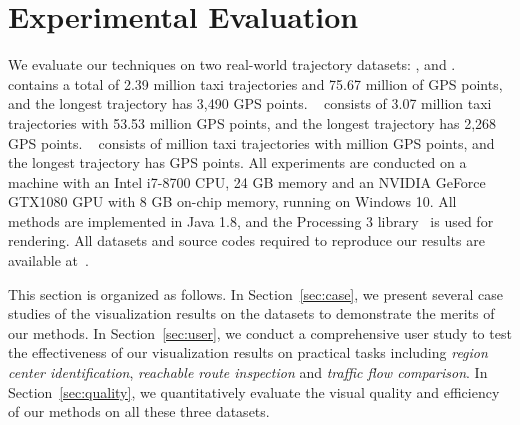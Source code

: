 \section{Experimental Evaluation}\label{sec:exp}
We evaluate our techniques on two real-world trajectory datasets: \pt{}, \sz{} and \cd{}.
\pt{}~\cite{pt} contains a total of 2.39 million taxi trajectories and 75.67 million of GPS points, and the longest trajectory has 3,490 GPS points.
\sz{}~\cite{sz} consists of 3.07 million taxi trajectories with 53.53 million GPS points, and the longest trajectory has 2,268 GPS points. 
\cd{}~\cite{cd} consists of  million taxi trajectories with  million GPS points, and the longest trajectory has  GPS points.  All experiments are conducted on a machine with an Intel i7-8700 CPU, 24 GB memory and an NVIDIA GeForce GTX1080 GPU with 8 GB on-chip memory, running on Windows 10. All methods are implemented in Java 1.8, and the Processing 3 library~\cite{p3} is used for rendering. All datasets and source codes required to reproduce our results are available at~\cite{code}.

This section is organized as follows.
In Section~\ref{sec:case}, we present several case studies of the visualization results on the \pt{} datasets to demonstrate the merits of our methods.
In Section~\ref{sec:user}, we conduct a comprehensive user study to test the effectiveness of our visualization results on practical tasks including \textit{region center identification}, \textit{reachable route inspection} and \textit{traffic flow comparison}. In Section~\ref{sec:quality}, we quantitatively evaluate the visual quality and efficiency of our methods on all these three datasets.

\trim \trim






